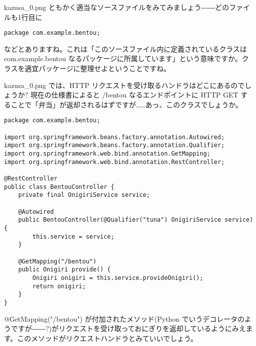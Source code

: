 \documentclass[b5paper,xelatex,ja=standard,10pt]{bxjsarticle}
\begin{document}
\begin{SERIFU}[colback=PaleIris]{kazusa_0.png}
ともかく適当なソースファイルをみてみましょう――どのファイルも1行目に
\begin{CODE}[title=\texttt{src/main/java/com/example/bentou/BentouApplication.java}]
\begin{lstlisting}[basicstyle=\normalsize]
package com.example.bentou;
\end{lstlisting}
\end{CODE}
などとありますね。これは「このソースファイル内に定義されているクラスは com.example.bentou なるパッケージに所属しています」という意味ですか。クラスを適宜パッケージに整理せよということですね。
\end{SERIFU}

\begin{SERIFU}[colback=PaleIris]{kazusa_0.png}
では、HTTP リクエストを受け取るハンドラはどこにあるのでしょうか?  現在の仕様書によると {/bentou} なるエンドポイントに HTTP GET することで「弁当」が返却されるはずですが……あっ、このクラスでしょうか。
\begin{CODE}[title=\texttt{src/main/java/com/example/bentou/BentouController.java}]
\begin{lstlisting}[basicstyle=\normalsize]
package com.example.bentou;

import org.springframework.beans.factory.annotation.Autowired;
import org.springframework.beans.factory.annotation.Qualifier;
import org.springframework.web.bind.annotation.GetMapping;
import org.springframework.web.bind.annotation.RestController;

@RestController
public class BentouController {
    private final OnigiriService service;

    @Autowired
    public BentouController(@Qualifier("tuna") OnigiriService service) {
        this.service = service;
    }

    @GetMapping("/bentou")
    public Onigiri provide() {
        Onigiri onigiri = this.service.provideOnigiri();
        return onigiri;
    }
}
\end{lstlisting}
\end{CODE}
{@GetMapping}({"/bentou"}) が付加されたメソッド(Python でいうデコレータのようですが――?)がリクエストを受け取っておにぎりを返却しているようにみえます。このメソッドがリクエストハンドラとみていいでしょう。
\end{SERIFU}


\renewcommand*{\mysectiontitle}{クッキー、最大の謎に直面する}
\end{document}

